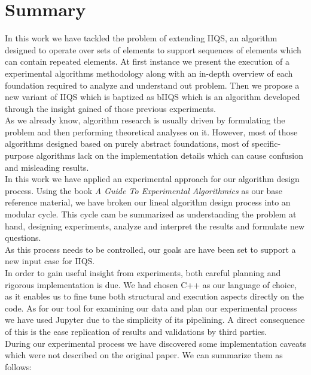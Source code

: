 \chapter{Summary}
\label{CHAPTER:SUMMARY}

In this work we have tackled the problem of extending IIQS, an algorithm designed to operate over sets of elements to support sequences of elements which can contain repeated elements. At first instance we present the execution of a experimental algorithms methodology along with an in-depth overview of each foundation required to analyze and understand out problem. Then we propose a new variant of IIQS which is baptized as bIIQS which is an algorithm developed through the insight gained of those previous experiments.\\

As we already know, algorithm research is usually driven by formulating the problem and then performing theoretical analyses on it. However, most of those algorithms designed based on purely abstract foundations, most of specific-purpose algorithms lack on the implementation details which can cause confusion and misleading results.\\

In this work we have applied an experimental approach for our algorithm design process. Using the book \emph{A Guide To Experimental Algorithmics}\cite{10.5555/2159557} as our base reference material, we have broken our lineal algorithm design process into an modular cycle. This cycle cam be summarized as understanding the problem at hand, designing experiments, analyze and interpret the results and formulate new questions.\\

As this process needs to be controlled, our goals are have been set to support a new input case for IIQS.\\

In order to gain useful insight from experiments, both careful planning and rigorous implementation is due. We had chosen C++ as our language of choice, as it enables us to fine tune both structural and execution aspects directly on the code. As for our tool for examining our data and plan our experimental process we have used Jupyter due to the simplicity of its pipelining. A direct consequence of this is the ease replication of results and validations by third parties.\\

During our experimental process we have discovered some implementation caveats which were not described on the original paper. We can summarize them as follows:

